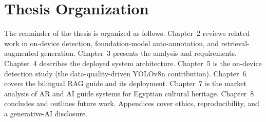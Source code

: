 \section{Thesis Organization}

The remainder of the thesis is organized as follows. Chapter~2 reviews related work
in on-device detection, foundation-model auto-annotation, and retrieval-augmented
generation. Chapter~3 presents the analysis and requirements. Chapter~4 describes the
deployed system architecture. Chapter~5 is the on-device detection study (the
data-quality-driven YOLOv8n contribution). Chapter~6 covers the bilingual RAG guide
and its deployment. Chapter~7 is the market analysis of AR and AI guide systems for
Egyptian cultural heritage. Chapter~8 concludes and outlines future work. Appendices
cover ethics, reproducibility, and a generative-AI disclosure.
